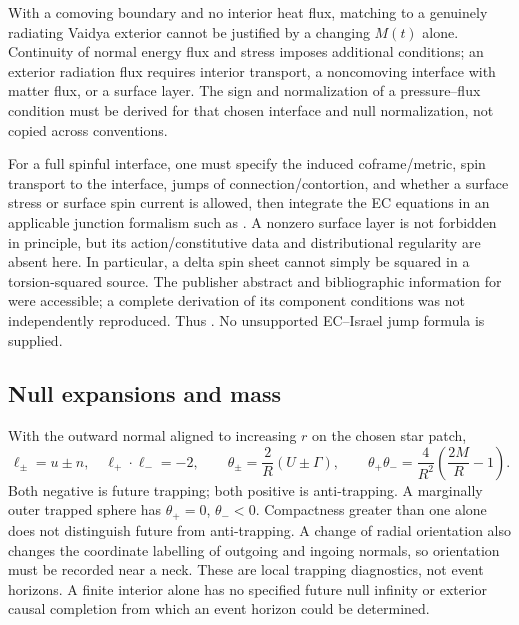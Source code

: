 With a comoving boundary and no interior heat flux, matching to a genuinely radiating Vaidya exterior cannot be justified by a changing $M(t)$ alone. Continuity of normal energy flux and stress imposes additional conditions; an exterior radiation flux requires interior transport, a noncomoving interface with matter flux, or a surface layer. The sign and normalization of a pressure--flux condition must be derived for that chosen interface and null normalization, not copied across conventions.

For a full spinful interface, one must specify the induced coframe/metric, spin transport to the interface, jumps of connection/contortion, and whether a surface stress or surface spin current is allowed, then integrate the EC equations in an applicable junction formalism such as \cite{AKP}. A nonzero surface layer is not forbidden in principle, but its action/constitutive data and distributional regularity are absent here. In particular, a delta spin sheet cannot simply be squared in a torsion-squared source. The publisher abstract and bibliographic information for \cite{AKP} were accessible; a complete derivation of its component conditions was not independently reproduced. Thus . No unsupported EC--Israel jump formula is supplied.

\subsection{Null expansions and mass}
With the outward normal aligned to increasing $r$ on the chosen star patch,
\begin{equation}
 \ell_\pm=u\pm n,\quad\ell_+\cdot\ell_-=-2,\qquad
 \theta_\pm=\frac2R(U\pm\Gamma),\qquad
 \theta_+\theta_- =\frac4{R^2}\left(\frac{2M}{R}-1\right).
\end{equation}
Both negative is future trapping; both positive is anti-trapping. A marginally outer trapped sphere has $\theta_+=0$, $\theta_-<0$. Compactness greater than one alone does not distinguish future from anti-trapping. A change of radial orientation also changes the coordinate labelling of outgoing and ingoing normals, so orientation must be recorded near a neck. These are local trapping diagnostics, not event horizons. A finite interior alone has no specified future null infinity or exterior causal completion from which an event horizon could be determined.

